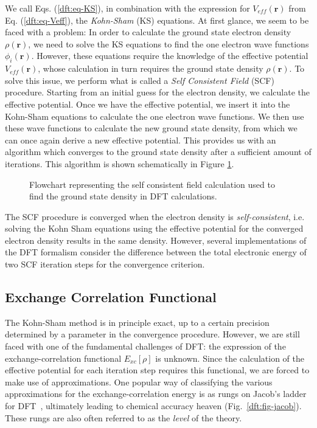 \begin{refsection}
We call Eqs. (\ref{dft:eq-KS}), in combination with the expression for 
$V_{eff}(\mathbf{r})$ from Eq. (\ref{dft:eq-Veff}), the \textit{Kohn-Sham} (KS) 
equations. At first glance, we seem to be faced with a problem: In order to 
calculate the ground state electron density $\rho(\mathbf{r})$, we need to 
solve the KS equations to find the one electron wave functions 
$\phi_i(\mathbf{r})$. However, these equations require the knowledge of the 
effective potential $V_{eff}(\mathbf{r})$, whose calculation in turn requires 
the ground state density $\rho(\mathbf{r})$. To solve this issue, we perform 
what is called a \textit{Self Consistent Field} (SCF) procedure. Starting from 
an initial guess for the electron density, we calculate the effective 
potential. Once we have the effective potential, we insert it into the 
Kohn-Sham equations to calculate the one electron wave functions. We then use 
these wave functions to calculate the new ground state density, from which we 
can once again derive a new effective potential. This provides us with an 
algorithm which converges to the ground state density after a sufficient 
amount of iterations. This algorithm is shown schematically in Figure 
\ref{dft:fig-scf_cycle}.  

\begin{figure}[ht]  
\centering 

\caption{\label{dft:fig-scf_cycle} Flowchart representing the self consistent field 
calculation used to find the ground state density in DFT calculations.} 
\end{figure} 
 
The SCF procedure is converged when the electron density is 
\textit{self-consistent}, i.e. solving the Kohn Sham equations using the 
effective potential for the converged electron density results in the same 
density. However, several implementations of the DFT formalism consider the 
difference between the total electronic energy of two SCF iteration steps for 
the convergence criterion. 
 
\subsection{Exchange Correlation Functional} \label{dft:sec-functionals} 
 
The Kohn-Sham method is in principle exact, up to a certain precision 
determined by a parameter in the convergence procedure. However, we are still 
faced with one of the fundamental challenges of DFT: the expression of the 
exchange-correlation functional $E_{xc}[\rho]$ is unknown. Since the calculation of the effective potential for each iteration step requires this functional, we 
are forced to make use of approximations. One popular way of classifying the 
various approximations for the exchange-correlation energy is as rungs on 
Jacob's ladder for DFT~\cite{Perdew2001}, ultimately leading to chemical 
accuracy heaven (Fig.~\ref{dft:fig-jacob}). These rungs are also often referred to 
as the \textit{level} of the theory. 
 

\end{refsection}
